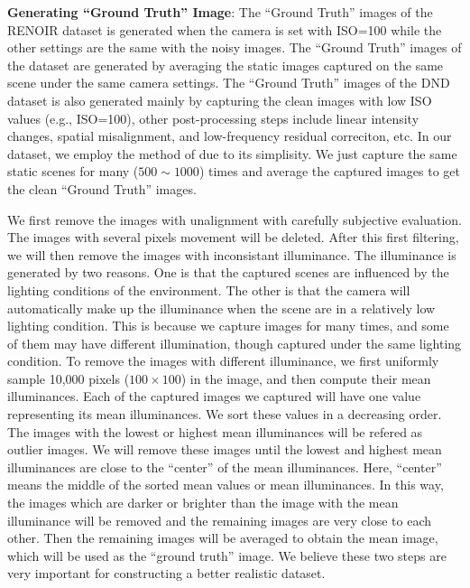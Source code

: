\textbf{Generating ``Ground Truth'' Image}: The ``Ground Truth'' images of the RENOIR dataset \cite{RENOIR2014} is generated when the camera is set with ISO=100 while the other settings are the same with the noisy images. The ``Ground Truth'' images of the dataset \cite{crosschannel2016} are generated by averaging the static images captured on the same scene under the same camera settings. The ``Ground Truth'' images of the DND dataset \cite{dnd2017} is also generated mainly by capturing the clean images with low ISO values (e.g., ISO=100), other post-processing steps include linear intensity changes, spatial misalignment, and low-frequency residual correciton, etc. In our dataset, we employ the method of \cite{crosschannel2016} due to its simplisity. We just capture the same static scenes for many ($500\sim1000$) times and average the captured images to get the clean ``Ground Truth'' images. 

We first remove the images with unalignment with carefully subjective evaluation. The images with several pixels movement will be deleted. After this first filtering, we will then remove the images with inconsistant illuminance. The illuminance is generated by two reasons. One is that the captured scenes are influenced by the lighting conditions of the environment. The other is that the camera will automatically make up the illuminance when the scene are in a relatively low lighting condition. This is because we capture images for many times, and some of them may have different illumination, though captured under the same lighting condition. To remove the images with different illuminance, we first uniformly sample 10,000 pixels ($100\times100$) in the image, and then compute their mean illuminances. Each of the captured images we captured will have one value representing its mean illuminances. We sort these values in a decreasing order. The images with the lowest or highest mean illuminances will be refered as outlier images. We will remove these images until the lowest and highest mean illuminances are close to the ``center'' of the mean illuminances. Here, ``center'' means the middle of the sorted mean values or mean illuminances. In this way, the images which are darker or brighter than the image with the mean illuminance will be removed and the remaining images are very close to each other. Then the remaining images will be averaged to obtain the mean image, which will be used as the ``ground truth'' image. We believe these two steps are very important for constructing a better realistic dataset.

